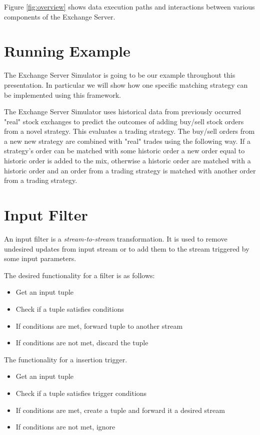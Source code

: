 \documentclass{article}
\begin{document}
Figure \ref{fig:overview} shows data execution paths and interactions between various components of the Exchange Server.

\section{Running Example}

The Exchange Server Simulator is going to be our example throughout this presentation. In particular we will show how one specific matching strategy can be implemented using this framework.

The Exchange Server Simulator uses historical data from previously occurred "real" stock exchanges to predict the outcomes of adding buy/sell stock orders from a novel strategy. This evaluates a trading strategy. The buy/sell orders from a new new strategy are combined with "real" trades using the following way. If a strategy's order can be matched with some historic order a new order equal to historic order is added to the mix, otherwise a historic order are matched with a historic order and an order from a trading strategy is matched with another order from a trading strategy.

\section{Input Filter}

An input filter is a \emph{stream-to-stream} transformation. It is used to remove undesired updates from input stream or to add them to the stream triggered by some input parameters.

The desired functionality for a filter is as follows:

\begin{itemize}
    \item Get an input tuple
    \item Check if a tuple satisfies conditions
    \item If conditions are met, forward tuple to another stream
    \item If conditions are not met, discard the tuple
\end{itemize}

The functionality for a insertion trigger.

\begin{itemize}
    \item Get an input tuple
    \item Check if a tuple satisfies trigger conditions
    \item If conditions are met, create a tuple and forward it a desired stream
    \item If conditions are not met, ignore
\end{itemize}
\end{document}
